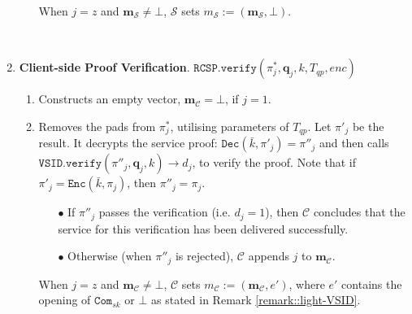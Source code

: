 \begin{enumerate}
\begin{enumerate}
\begin{itemize}
\end{itemize}
When $j=z$  and $\bm{m}_{\scriptscriptstyle\mathcal{S}}\neq\bot$, $\mathcal S$ sets    $m_{\scriptscriptstyle\mathcal S}:=(\bm{m}_{\scriptscriptstyle\mathcal{S}},\bot)$.

\end{enumerate}

\

\item \textbf{Client-side Proof Verification}.\label{Client-sideProofVerification} $\mathtt{RCSP}.\mathtt{verify}(\pi^{\scriptscriptstyle *}_{\scriptscriptstyle j}, \bm{q}_{\scriptscriptstyle j},k,T_{\scriptscriptstyle qp},enc)$
\begin{enumerate}


\item Constructs an empty vector, $\bm{m}_{\scriptscriptstyle\mathcal C}=\bot$, if $j=1$. 

\item Removes the pads from $\pi^{\scriptscriptstyle *}_{\scriptscriptstyle j}$, utilising  parameters of $T_{\scriptscriptstyle qp}$. Let $\pi'_{\scriptscriptstyle j}$ be the result. It decrypts the service proof: $\mathtt{Dec}(\bar{k},\pi'_{\scriptscriptstyle j})=\pi''_{\scriptscriptstyle j}$ and then calls $\mathtt{VSID.verify}(\pi''_{\scriptscriptstyle j}, \bm{q}_{\scriptscriptstyle j},k)\rightarrow d_{\scriptscriptstyle j}$, to verify the proof. Note that if $\pi'_{\scriptscriptstyle j}=\mathtt{Enc}(\bar{k},\pi_{\scriptscriptstyle j})$, then $\pi''_{\scriptscriptstyle j}=\pi_{\scriptscriptstyle j}$. 

\begin{itemize}
\item[$\bullet$] If $\pi''_{\scriptscriptstyle j}$ passes the verification (i.e. $d_{\scriptscriptstyle j}=1$), then $\mathcal C$ concludes that the service  for this verification has been delivered successfully. 

\item[$\bullet$]  Otherwise (when $\pi''_{\scriptscriptstyle j}$ is rejected), $\mathcal C$ appends $j$  to $\bm{m}_{\scriptscriptstyle\mathcal{C}}$. 


\end{itemize}
When $j=z$  and $\bm{m}_{\scriptscriptstyle\mathcal{C}}\neq\bot$, $\mathcal C$ sets    ${m}_{\scriptscriptstyle\mathcal C}:=(\bm{m}_{\scriptscriptstyle\mathcal{C}},e')$, where  $e'$  contains the opening of $\mathtt{Com}_{\scriptscriptstyle sk}$ or  $\bot$ as stated in Remark \ref{remark::light-VSID}.



\end{enumerate}
\end{enumerate}
